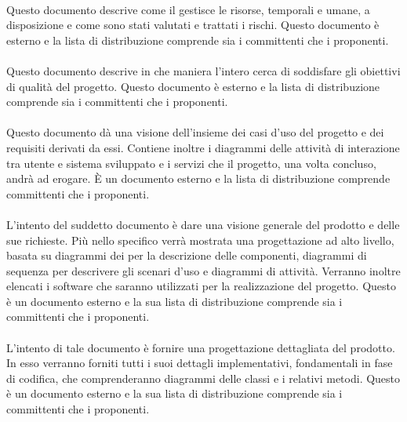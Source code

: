 \paragraph{\PdP}
Questo documento descrive come il  gestisce le risorse, temporali e umane, a disposizione e come sono stati valutati e trattati i rischi. Questo documento è esterno e la lista di distribuzione comprende sia i committenti che i proponenti.

\paragraph{\PdQ}
Questo documento descrive in che maniera l'intero  cerca di soddisfare gli obiettivi di qualità del progetto. Questo documento è esterno e la lista di distribuzione comprende sia i committenti che i proponenti.

\paragraph{\AdR}
Questo documento dà una visione dell'insieme dei casi d'uso del progetto e dei requisiti derivati da essi. Contiene inoltre i diagrammi delle attività di interazione tra utente e sistema sviluppato e i servizi che il progetto, una volta concluso, andrà ad erogare. È un documento esterno e la lista di distribuzione comprende committenti che i proponenti.

\paragraph{\ST}
L'intento del suddetto documento è dare una visione generale del prodotto e delle sue richieste. Più nello specifico verrà mostrata una progettazione ad alto livello, basata su diagrammi dei  per la descrizione delle componenti, diagrammi di sequenza per descrivere gli scenari d'uso e diagrammi di attività. Verranno inoltre elencati i software che saranno utilizzati per la realizzazione del progetto. Questo è un documento esterno e la sua lista di distribuzione comprende  sia i committenti che i proponenti.

\paragraph{\DDP}
L'intento di tale documento è fornire una progettazione dettagliata del
prodotto. In esso verranno forniti tutti i suoi dettagli implementativi, fondamentali in fase di codifica, che comprenderanno diagrammi  delle classi e i relativi metodi. Questo è un documento esterno e la sua lista di distribuzione comprende  sia i committenti che i proponenti.

